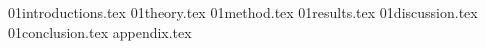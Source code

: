 \documentclass{article}
\begin{document}
\maketitle
\pagebreak
\tableofcontents

\pagebreak
{01introductions.tex}
\pagebreak
{01theory.tex}
\pagebreak
{01method.tex}
\pagebreak
{01results.tex}
\pagebreak
{01discussion.tex}
\pagebreak
{01conclusion.tex}
\pagebreak
{appendix.tex}
\pagebreak
\printbibliography
\end{document}
